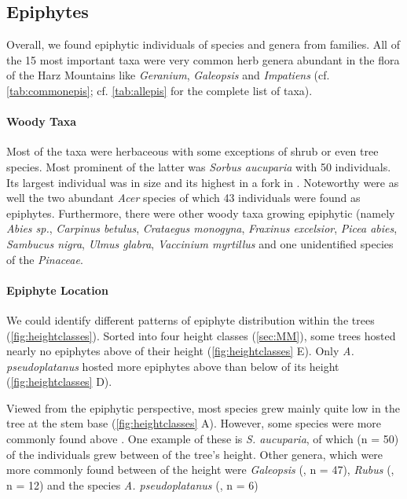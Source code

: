 \documentclass[12pt, a4paper, oneside, draft]{scrartcl}
\begin{document}
	\subsection{Epiphytes}  
	 Overall, we found epiphytic individuals of  species and  genera from  families. All of the 15 most important taxa were very common herb genera abundant in the flora of the Harz Mountains like \textit{Geranium}, \textit{Galeopsis} and \textit{Impatiens} (cf. \autoref{tab:commonepis}; cf. \autoref{tab:allepis} for the complete list of taxa). 

		\paragraph{Woody Taxa} Most of the taxa were herbaceous with some exceptions of shrub or even tree species. Most prominent of the latter was \textit{Sorbus aucuparia} with 50 individuals. Its largest individual was  in size and its highest in a fork in . Noteworthy were as well the two abundant \textit{Acer} species of which 43 individuals were found as epiphytes. Furthermore, there were  other woody taxa growing epiphytic (namely \textit{Abies sp.}, \textit{Carpinus betulus}, \textit{Crataegus monogyna}, \textit{Fraxinus excelsior}, \textit{Picea abies}, \textit{Sambucus nigra}, \textit{Ulmus glabra}, \textit{Vaccinium myrtillus} and one unidentified species of the \textit{Pinaceae}.
		
		
	
	
		\paragraph{Epiphyte Location}
		We could identify different patterns of epiphyte distribution within the trees (\ref{fig:heightclasses}). Sorted into four height classes (\autoref{sec:MM}), some trees hosted nearly no epiphytes above  of their height (\autoref{fig:heightclasses} E). Only \textit{A. pseudoplatanus} hosted more epiphytes above than below  of its height (\autoref{fig:heightclasses} D).
		
		
	
		Viewed from the epiphytic perspective, most species grew mainly quite low in the tree at the stem base (\autoref{fig:heightclasses} A). However, some species were more commonly found above . One example of these is \textit{S. aucuparia}, of which  (n = 50) of the individuals grew between  of the tree's height. Other genera, which were more commonly found between  of the height were \textit{Galeopsis} (, n = 47), \textit{Rubus} (, n = 12) and the species \textit{A. pseudoplatanus} (, n = 6)
		
\end{document}
